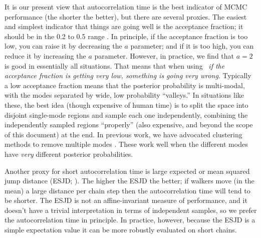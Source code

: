 It is our present view that autocorrelation time is the best indicator
of MCMC performance (the shorter the better), but there are several
proxies.  The easiest and simplest indicator that things are going
well is the acceptance fraction; it should be in the 0.2 to 0.5 range
\citep[there are theorems about this for specific problems;
for example][]{Gelman:1996}.  In principle,
if the acceptance fraction is too low, you can raise it by decreasing
the $a$ parameter; and if it is too high, you can reduce it by
increasing the $a$ parameter.  However, in practice, we find that
$a=2$ is good in essentially all situations.  That means that when
using \this\ \emph{if the acceptance fraction is getting very low,
  something is going very wrong}.  Typically a low acceptance fraction
means that the posterior probability is multi-modal, with the modes
separated by wide, low probability ``valleys.''  In situations like
these, the best idea (though expensive of human time) is to split the
space into disjoint single-mode regions and sample each one
independently, combining the independently sampled regions
``properly'' (also expensive, and beyond the scope of this document)
at the end.  In previous work, we have advocated clustering methods to
remove multiple modes \citep{Hou:2012}.  These work well when the
different modes have \emph{very} different posterior probabilities.

Another proxy for short autocorrelation time is large expected or mean
squared jump distance (ESJD; \citealt{Pasarica:2010}).  The higher the
ESJD the better; if walkers move (in the mean) a large distance per
chain step then the
autocorrelation time will tend to be shorter.  The ESJD is not an
affine-invariant measure of performance, and it doesn't have a
trivial interpretation in terms of independent samples, so we prefer
the autocorrelation time in principle.  In practice, however, because
the ESJD is a simple expectation value it can be more robustly
evaluated on short chains.

